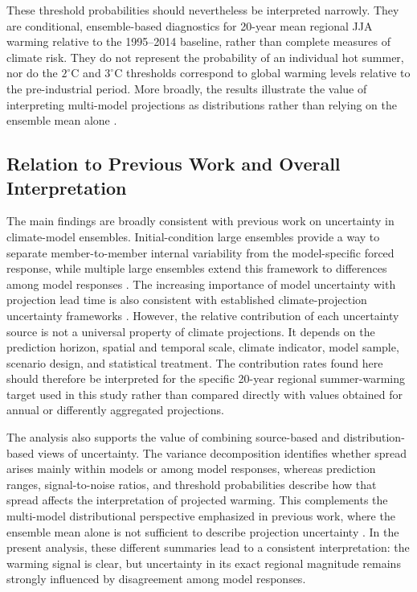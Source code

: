 \documentclass[
]{krantz}
\begin{document}
These threshold probabilities should nevertheless be interpreted narrowly. They are conditional, ensemble-based diagnostics for 20-year mean regional JJA warming relative to the 1995--2014 baseline, rather than complete measures of climate risk. They do not represent the probability of an individual hot summer, nor do the \(2^\circ\mathrm{C}\) and \(3^\circ\mathrm{C}\) thresholds correspond to global warming levels relative to the pre-industrial period. More broadly, the results illustrate the value of interpreting multi-model projections as distributions rather than relying on the ensemble mean alone \citep{Tebaldi2007}.

\subsection{Relation to Previous Work and Overall Interpretation}\label{relation-to-previous-work-and-overall-interpretation}

The main findings are broadly consistent with previous work on uncertainty in climate-model ensembles. Initial-condition large ensembles provide a way to separate member-to-member internal variability from the model-specific forced response, while multiple large ensembles extend this framework to differences among model responses \citep{Deser2020, Lehner2020}. The increasing importance of model uncertainty with projection lead time is also consistent with established climate-projection uncertainty frameworks \citep{Hawkins2009, Lehner2020}. However, the relative contribution of each uncertainty source is not a universal property of climate projections. It depends on the prediction horizon, spatial and temporal scale, climate indicator, model sample, scenario design, and statistical treatment. The contribution rates found here should therefore be interpreted for the specific 20-year regional summer-warming target used in this study rather than compared directly with values obtained for annual or differently aggregated projections.

The analysis also supports the value of combining source-based and distribution-based views of uncertainty. The variance decomposition identifies whether spread arises mainly within models or among model responses, whereas prediction ranges, signal-to-noise ratios, and threshold probabilities describe how that spread affects the interpretation of projected warming. This complements the multi-model distributional perspective emphasized in previous work, where the ensemble mean alone is not sufficient to describe projection uncertainty \citep{Tebaldi2007}. In the present analysis, these different summaries lead to a consistent interpretation: the warming signal is clear, but uncertainty in its exact regional magnitude remains strongly influenced by disagreement among model responses.
\end{document}

